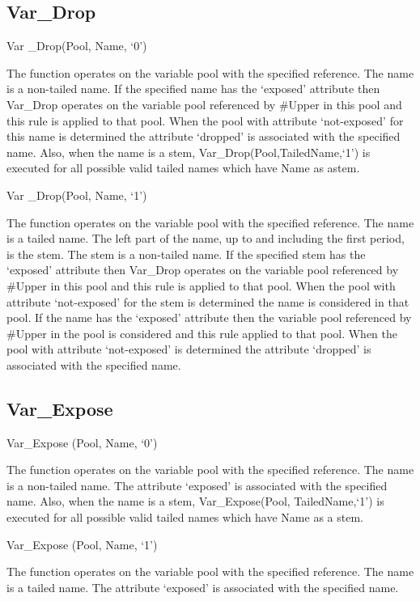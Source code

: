\subsection{Var\_Drop}\label{var_drop}

Var \_Drop(Pool, Name, `0')

The function operates on the variable pool with the specified reference.
The name is a non-tailed name. If the specified name has the `exposed'
attribute then Var\_Drop operates on the variable pool referenced by
\#Upper in this pool and this rule is applied to that pool. When the
pool with attribute `not-exposed' for this name is determined the
attribute `dropped' is associated with the specified name. Also, when
the name is a stem, Var\_Drop(Pool,TailedName,`1') is executed for all
possible valid tailed names which have Name as astem.

Var \_Drop(Pool, Name, `1')

The function operates on the variable pool with the specified reference.
The name is a tailed name. The left part of the name, up to and
including the first period, is the stem. The stem is a non-tailed name.
If the specified stem has the `exposed' attribute then Var\_Drop
operates on the variable pool referenced by \#Upper in this pool and
this rule is applied to that pool. When the pool with attribute
`not-exposed' for the stem is determined the name is considered in that
pool. If the name has the `exposed' attribute then the variable pool
referenced by \#Upper in the pool is considered and this rule applied to
that pool. When the pool with attribute `not-exposed' is determined the
attribute `dropped' is associated with the specified name.

\subsection{Var\_Expose}\label{var_expose}

Var\_Expose (Pool, Name, `0')

The function operates on the variable pool with the specified reference.
The name is a non-tailed name. The attribute `exposed' is associated
with the specified name. Also, when the name is a stem,
Var\_Expose(Pool, TailedName,`1') is executed for all possible valid
tailed names which have Name as a stem.

Var\_Expose (Pool, Name, `1')

The function operates on the variable pool with the specified reference.
The name is a tailed name. The attribute `exposed' is associated with
the specified name.

